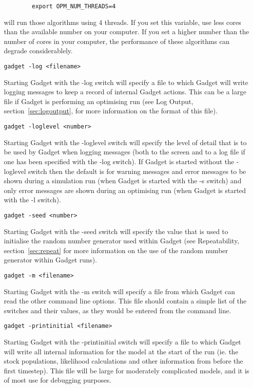 \documentclass[10pt,twoside]{book}
\begin{document}
{\small\begin{verbatim}
		export OPM_NUM_THREADS=4
\end{verbatim}}
will run those algorithms using 4 threads. If you set this variable, use less cores than the available number on your computer. If you set a higher number than the number of cores in your computer, the performance of these algorithms can degrade considerablely.   


{\small\begin{verbatim}
gadget -log <filename>
\end{verbatim}}
Starting Gadget with the -log switch will specify a file to which Gadget will write logging messages to keep a record of internal Gadget actions.  This can be a large file if Gadget is performing an optimising run (see Log Output, section~\ref{sec:logoutput}, for more information on the format of this file).

{\small\begin{verbatim}
gadget -loglevel <number>
\end{verbatim}}
Starting Gadget with the -loglevel switch will specify the level of detail that is to be used by Gadget when logging messages (both to the screen and to a log file if one has been specified with the -log switch).  If Gadget is started without the -loglevel switch then the default is for warning messages and error messages to be shown during a simulation run (when Gadget is started with the -s switch) and only error messages are shown during an optimising run (when Gadget is started with the -l switch).

{\small\begin{verbatim}
gadget -seed <number>
\end{verbatim}}
Starting Gadget with the -seed switch will specify the value that is used to initialise the random number generator used within Gadget (see Repeatability, section~\ref{sec:repeat} for more information on the use of the random number generator within Gadget runs).

{\small\begin{verbatim}
gadget -m <filename>
\end{verbatim}}
Starting Gadget with the -m switch will specify a file from which Gadget can read the other command line options.  This file should contain a simple list of the switches and their values, as they would be entered from the command line.

{\small\begin{verbatim}
gadget -printinitial <filename>
\end{verbatim}}
Starting Gadget with the -printinitial switch will specify a file to which Gadget will write all internal information for the model at the start of the run (ie. the stock populations, likelihood calculations and other information from before the first timestep).  This file will be large for moderately complicated models, and it is of most use for debugging purposes.
\end{document}

